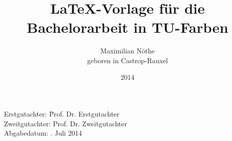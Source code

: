 








\newcommand{\thetitle}{\LaTeX-Vorlage für die Bachelorarbeit in TU-Farben}
\newcommand{\Jahr}{2014}
\newcommand{\Geburtsort}{Castrop-Rauxel}
\newcommand{\Lehrstuhl}{Experimentelle Physik V}
\newcommand{\Betreuer}{Prof. Dr. Erstgutachter}
\newcommand{\Zweitgutachter}{Prof. Dr. Zweitgutachter}
\newcommand{\Abgabedatum}{11. Juli 2014}

\author{
    Maximilian Nöthe\\
    geboren in \Geburtsort
}

\titlehead{
    \texttt{[image: Plots/tu-logo.pdf]}
}
\title{\thetitle}
\date{\Jahr}

\subject{Arbeit zur Erlangung des akademischen Grades\\Bachelor of Science}
\publishers{Lehrstuhl für \Lehrstuhl \\ Fakultät Physik \\ Technische Universität Dortmund}




\frontmatter
\maketitle
\thispagestyle{empty}
\vspace*{\fill}
\begin{tabbing}
    Erstgutachter: \hspace{3em}\=   \Betreuer \\ 
    Zweitgutachter: \> \Zweitgutachter\\
    Abgabedatum: \>\Abgabedatum
\end{tabbing}
\newpage

